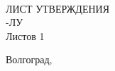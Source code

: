 {    \vspace{\fill}
    \begin{center}
    \VSTUTitle\\
    \vspace{8mm}
    ЛИСТ УТВЕРЖДЕНИЯ\\
    \VSTULUCode-ЛУ\\
    Листов 1\\
    \vspace{\fill}
    \end{center}
    \begin{flushright}
    \VSTUTitleDirector
    \vfill
    \VSTUTitleImplementer
    \end{flushright}
    \vspace{\fill}
    \begin{center}
    Волгоград,~\the\year
    \end{center}
    \clearpage
}
